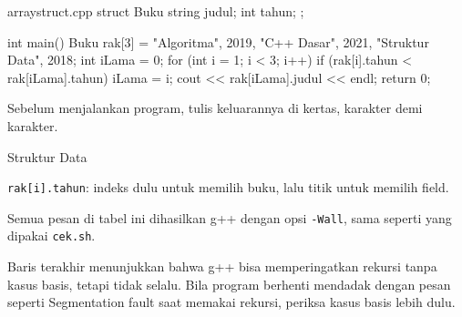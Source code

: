 \documentclass[a4paper]{article}
\begin{document}
\begin{MKode}{arraystruct.cpp}
struct Buku { string judul; int tahun; };

int main() {
    Buku rak[3] = {{"Algoritma", 2019},
                   {"C++ Dasar", 2021},
                   {"Struktur Data", 2018}};
    int iLama = 0;
    for (int i = 1; i < 3; i++)
        if (rak[i].tahun < rak[iLama].tahun) iLama = i;
    cout << rak[iLama].judul << endl;
    return 0;
}
\end{MKode}
\begin{Tebak}[]
Sebelum menjalankan program, tulis keluarannya di kertas, karakter demi karakter.
\end{Tebak}
\begin{Jawaban}[]
\begin{MKeluaran}[]
Struktur Data
\end{MKeluaran}
\texttt{rak[i].tahun}: indeks dulu untuk memilih buku, lalu titik untuk memilih field.
\end{Jawaban}
Semua pesan di tabel ini dihasilkan g++ dengan opsi \texttt{-Wall}, sama seperti yang dipakai \texttt{cek.sh}.
\par\vspace{4pt}\par\vspace{6pt}
Baris terakhir menunjukkan bahwa g++ bisa memperingatkan rekursi tanpa kasus basis, tetapi tidak selalu. Bila program berhenti mendadak dengan pesan seperti Segmentation fault saat memakai rekursi, periksa kasus basis lebih dulu.
\end{document}

